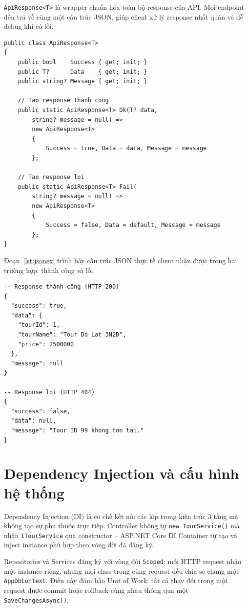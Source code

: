 \texttt{ApiResponse<T>} là wrapper chuẩn hóa toàn bộ response
của API. Mọi endpoint đều trả về cùng một cấu trúc JSON, giúp
client xử lý response nhất quán và dễ debug khi có lỗi.

\begin{lstlisting}[style=csharp,
  caption={ApiResponse<T> -- wrapper chuẩn hóa response},
  label={lst:apiresponse}]
public class ApiResponse<T>
{
    public bool    Success { get; init; }
    public T?      Data    { get; init; }
    public string? Message { get; init; }

    // Tao response thanh cong
    public static ApiResponse<T> Ok(T? data,
        string? message = null) =>
        new ApiResponse<T>
        {
            Success = true, Data = data, Message = message
        };

    // Tao response loi
    public static ApiResponse<T> Fail(
        string? message = null) =>
        new ApiResponse<T>
        {
            Success = false, Data = default, Message = message
        };
}
\end{lstlisting}

Đoạn~\ref{lst:jsonex} trình bày cấu trúc JSON thực tế
client nhận được trong hai trường hợp: thành công và lỗi.

\begin{lstlisting}[style=sql,
  caption={Cấu trúc JSON response chuẩn hóa},
  label={lst:jsonex}]
-- Response thành công (HTTP 200)
{
  "success": true,
  "data": {
    "tourId": 1,
    "tourName": "Tour Da Lat 3N2D",
    "price": 2500000
  },
  "message": null
}

-- Response loi (HTTP 404)
{
  "success": false,
  "data": null,
  "message": "Tour ID 99 khong ton tai."
}
\end{lstlisting}

\section{Dependency Injection và cấu hình hệ thống}\label{Sec3.6}

Dependency Injection (DI) là cơ chế kết nối các lớp trong
kiến trúc 3 tầng mà không tạo sự phụ thuộc trực tiếp.
Controller không tự \texttt{new TourService()} mà nhận
\texttt{ITourService} qua constructor -- ASP.NET Core DI
Container tự tạo và inject instance phù hợp theo vòng đời
đã đăng ký.

Repositories và Services đăng ký với vòng đời
\texttt{Scoped}: mỗi HTTP request nhận một instance riêng,
nhưng mọi class trong cùng request đều chia sẻ chung một
\texttt{AppDbContext}. Điều này đảm bảo Unit of Work:
tất cả thay đổi trong một request được commit hoặc rollback
cùng nhau thông qua một \texttt{SaveChangesAsync()}.

